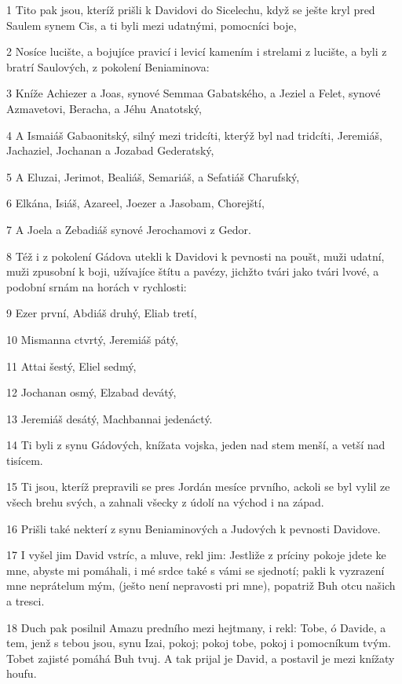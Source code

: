 \par 1 Tito pak jsou, kteríž prišli k Davidovi do Sicelechu, když se ješte kryl pred Saulem synem Cis, a ti byli mezi udatnými, pomocníci boje,
\par 2 Nosíce lucište, a bojujíce pravicí i levicí kamením i strelami z lucište, a byli z bratrí Saulových, z pokolení Beniaminova:
\par 3 Kníže Achiezer a Joas, synové Semmaa Gabatského, a Jeziel a Felet, synové Azmavetovi, Beracha, a Jéhu Anatotský,
\par 4 A Ismaiáš Gabaonitský, silný mezi tridcíti, kterýž byl nad tridcíti, Jeremiáš, Jachaziel, Jochanan a Jozabad Gederatský,
\par 5 A Eluzai, Jerimot, Bealiáš, Semariáš, a Sefatiáš Charufský,
\par 6 Elkána, Isiáš, Azareel, Joezer a Jasobam, Chorejští,
\par 7 A Joela a Zebadiáš synové Jerochamovi z Gedor.
\par 8 Též i z pokolení Gádova utekli k Davidovi k pevnosti na poušt, muži udatní, muži zpusobní k boji, užívajíce štítu a pavézy, jichžto tvári jako tvári lvové, a podobní srnám na horách v rychlosti:
\par 9 Ezer první, Abdiáš druhý, Eliab tretí,
\par 10 Mismanna ctvrtý, Jeremiáš pátý,
\par 11 Attai šestý, Eliel sedmý,
\par 12 Jochanan osmý, Elzabad devátý,
\par 13 Jeremiáš desátý, Machbannai jedenáctý.
\par 14 Ti byli z synu Gádových, knížata vojska, jeden nad stem menší, a vetší nad tisícem.
\par 15 Ti jsou, kteríž prepravili se pres Jordán mesíce prvního, ackoli se byl vylil ze všech brehu svých, a zahnali všecky z údolí na východ i na západ.
\par 16 Prišli také nekterí z synu Beniaminových a Judových k pevnosti Davidove.
\par 17 I vyšel jim David vstríc, a mluve, rekl jim: Jestliže z príciny pokoje jdete ke mne, abyste mi pomáhali, i mé srdce také s vámi se sjednotí; pakli k vyzrazení mne neprátelum mým, (ješto není nepravosti pri mne), popatriž Buh otcu našich a tresci.
\par 18 Duch pak posilnil Amazu predního mezi hejtmany, i rekl: Tobe, ó Davide, a tem, jenž s tebou jsou, synu Izai, pokoj; pokoj tobe, pokoj i pomocníkum tvým. Tobet zajisté pomáhá Buh tvuj. A tak prijal je David, a postavil je mezi knížaty houfu.
